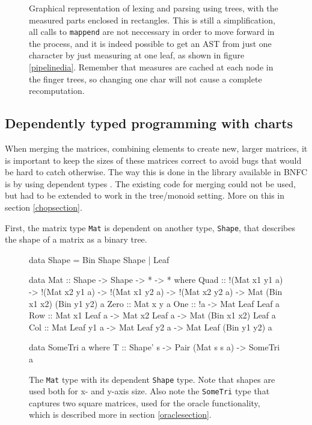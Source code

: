 \documentclass[a4paper,12pt,notitlepage]{report}
\renewcommand\cite{\citep}
\begin{document}
\begin{figure}[H]
\begin{tikzpicture}
    \end{tikzpicture}
\caption{\label{treemeasure} \small Graphical representation of lexing and
parsing using trees, with the measured parts enclosed in rectangles. This is
still a simplification, all calls to \texttt{mappend} are not neccessary in
order to move forward in the process, and it is indeed possible to get an AST
from just one character by just measuring at one leaf, as shown in figure
\ref{pipelinedia}. Remember that measures are cached at each node in the finger
trees, so changing one char will not cause a complete recomputation.}
\end{figure}

\subsection{Dependently typed programming with charts}
\label{depcharts}
When merging the matrices, combining elements to create new, larger matrices, it
is important to keep the sizes of these matrices correct to avoid bugs that
would be hard to catch otherwise. The way this is done in the library available
in BNFC is by using dependent types \cite{jyp-bnfc}. The existing code for
merging could not be used, but had to be extended to work in the tree/monoid
setting. More on this in section \ref{chopsection}.

First, the matrix type \texttt{Mat} is dependent on another type,
\texttt{Shape}, that describes the shape of a matrix as a binary tree.

\begin{figure}[H]
\begin{code}
data Shape = Bin Shape Shape | Leaf

data Mat :: Shape -> Shape -> * -> * where
  Quad :: !(Mat x1 y1 a) -> !(Mat x2 y1 a) ->
          !(Mat x1 y2 a) -> !(Mat x2 y2 a) ->
          Mat (Bin x1 x2) (Bin y1 y2) a
  Zero :: Mat x y a
  One :: !a -> Mat Leaf Leaf a
  Row :: Mat x1 Leaf a -> Mat x2 Leaf a -> Mat (Bin x1 x2) Leaf a
  Col :: Mat Leaf y1 a -> Mat Leaf y2 a -> Mat Leaf (Bin y1 y2) a

data SomeTri a where
  T :: Shape' s -> Pair (Mat s s a) -> SomeTri a
\end{code}
\caption{\label{mat} \small The \texttt{Mat} type with its dependent \texttt{Shape}
type. Note that shapes are used both for x- and y-axis size. Also note the
\texttt{SomeTri} type that captures two square matrices, used for the oracle
functionality, which is described more in section \ref{oraclesection}.}
\end{figure}
\end{document}
